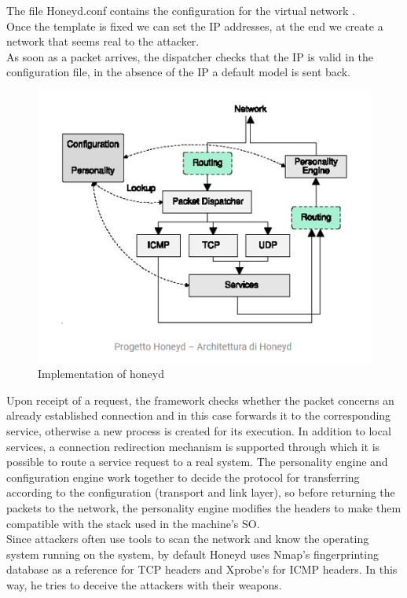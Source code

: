 \FloatBarrier
The file Honeyd.conf contains the configuration for the virtual network .\\
Once the template is fixed we can set the IP addresses, at the end we create a network that seems real to the attacker.\\

As soon as a packet arrives, the dispatcher checks that the IP is valid in the configuration file, in the absence of the IP a default model is sent back.
\begin{figure}[h!]
\centering
\includegraphics{images/honeyd.png}
\caption{Implementation of honeyd}
\label{fig:irradiances}
\end{figure}
\FloatBarrier
Upon receipt of a request, the framework checks whether the packet concerns an already established connection and in this case forwards it to the corresponding service, otherwise a new process is created for its execution. In addition to local services, a connection redirection mechanism is supported through which it is possible to route a service request to a real system.
The personality engine and configuration engine work together to decide the protocol for transferring according to the configuration (transport and link layer), so before returning the packets to the network, the personality engine modifies the headers to make them compatible with the stack used in the machine's SO.\\
Since attackers often use tools to scan the network and know the operating system running on the system, by default Honeyd uses Nmap's fingerprinting database as a reference for TCP headers and Xprobe's for ICMP headers. In this way, he tries to deceive the attackers with their weapons.
